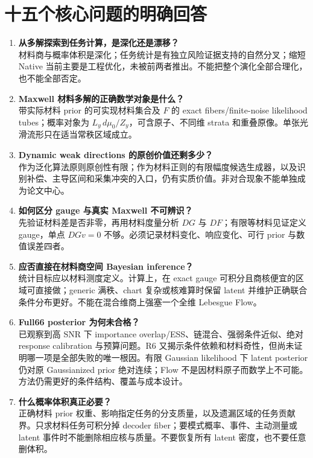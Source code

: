 \section{十五个核心问题的明确回答}
\label{sec:answers}
\begin{enumerate}[label=\textbf{\arabic*.},leftmargin=2em]
\item \textbf{从多解探索到任务计算，是深化还是漂移？}\\
材料商与概率体积是深化；任务统计是有独立风险证据支持的自然分叉；缩短 Native 当前主要是工程优化，未被前两者推出。不能把整个演化全部合理化，也不能全部否定。

\item \textbf{Maxwell 材料多解的正确数学对象是什么？}\\
带实际材料 prior 的可实现材料集合及 $F$ 的 exact fibers/finite-noise likelihood tubes；概率对象为 $L_y\,d\mu_0/Z_y$，可含原子、不同维 strata 和重叠原像。单张光滑流形只在适当常秩区域成立。

\item \textbf{Dynamic weak directions 的原创价值还剩多少？}\\
作为泛化算法原则原创性有限；作为材料正则的有限幅度候选生成器，以及识别补偿、主导区间和采集冲突的入口，仍有实质价值。非对合现象不能单独成为论文中心。

\item \textbf{如何区分 gauge 与真实 Maxwell 不可辨识？}\\
先验证材料差是否非零，再用材料度量分析 $DG$ 与 $DF$；有限等材料见证定义 gauge，单点 $DGv=0$ 不够。必须记录材料变化、响应变化、可行 prior 与数值误差四者。

\item \textbf{应否直接在材料商空间 Bayesian inference？}\\
统计目标应以材料测度定义。计算上，在 exact gauge 可积分且商核便宜的区域可直接做；generic 满秩、chart 复杂或核难算时保留 latent 并维护正确联合条件分布更好。不能在混合维商上强塞一个全维 Lebesgue Flow。

\item \textbf{Full66 posterior 为何未合格？}\\
已观察到高 SNR 下 importance overlap/ESS、链混合、强弱条件近似、绝对 response calibration 与预算问题。R6 又揭示条件依赖和材料奇性，但尚未证明哪一项是全部失败的唯一根因。有限 Gaussian likelihood 下 latent posterior 仍对原 Gaussianized prior 绝对连续；Flow 不是因材料原子而数学上不可能。方法仍需更好的条件结构、覆盖与成本设计。

\item \textbf{什么概率体积真正必要？}\\
正确材料 prior 权重、影响指定任务的分支质量，以及遗漏区域的任务贡献界。只求材料任务可积分掉 decoder fiber；要模式概率、事件、主动测量或 latent 事件时不能删除相应核与质量。不要恢复所有 latent 密度，也不要任意删体积。


\end{enumerate}
